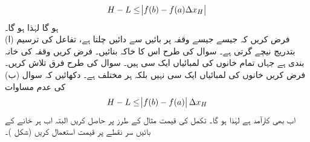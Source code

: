 \begin{align*}
H-L\le \abs{f(b)-f(a)\Delta x_H}
\end{align*}
ہو گا لہٰذا  ہو گا۔
\\
(ا) \quad
فرض کریں کہ جیسے جیسے   وقفہ  پر بائیں سے دائیں چلتا ہے، تفاعل  کی ترسیم بتدریج نیچے گرتی ہے۔ سوال  کی طرح اس کا خاکہ بنائیں۔ فرض کریں وقفہ  کی خانہ بندی  ہے جہاں تمام خانوں کی لمبائیاں  ایک  سی ہیں۔ سوال  کی طرح فرق  تلاش کریں۔\\
(ب) \quad
فرض کریں  خانوں کی لمبائیاں ایک  سی نہیں  بلکہ ہر  مختلف ہے۔ دکھائیں کہ سوال  کی عدم مساوات
\begin{align*}
H-L\le \abs{f(b)-f(a)}\Delta x_H
\end{align*}
اب بھی کارآمد ہے  لہٰذا  ہو گا۔
تکمل  کی قیمت مثال  کے  طرز پر حاصل کریں البتہ اب ہر خانے کے  بائیں سر نقطے پر  قیمت استعمال کریں (شکل )۔\\
